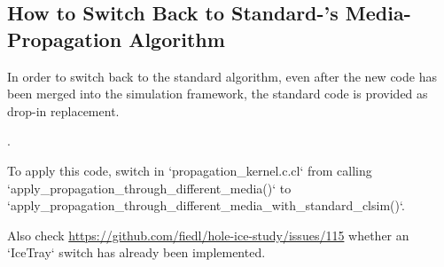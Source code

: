 
\subsection{How to Switch Back to Standard-\clsim's Media-Propagation Algorithm}
\label{sec:how_to_switch_media_propagation}

In order to switch back to the standard \clsim algorithm, even after the new code has been merged into the \icecube simulation framework, the standard \clsim code is provided as drop-in replacement.

.

To apply this code, switch in `propagation_kernel.c.cl` \newline
from calling `apply_propagation_through_different_media()` \newline
to `apply_propagation_through_different_media_with_standard_clsim()`.

Also check \url{https://github.com/fiedl/hole-ice-study/issues/115} whether an `IceTray` switch has already been implemented.